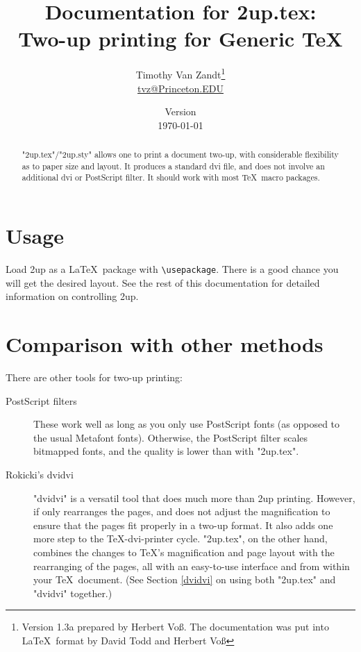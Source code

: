 \documentclass[12pt]{article}
\let\TUfv\fileversion
\begin{document}
\title{Documentation for 2up.tex:\\
  Two-up printing for Generic TeX}
\author{Timothy Van Zandt\thanks{Version 1.3a prepared by Herbert Voß. The documentation was put into
  \LaTeX\ format by David Todd and Herbert Voß}\\ \url{tvz@Princeton.EDU}}
\date{Version \TUfv\\[3pt] \today}

\maketitle
\thispagestyle{empty}

\begin{abstract}
  "2up.tex"/"2up.sty" allows one to print a document two-up, with
considerable flexibility as to paper size and layout. It produces a standard
dvi file, and does not involve an additional dvi or PostScript filter. It
should work with most \TeX\ macro packages.

\end{abstract}

\clearpage
\tableofcontents
\clearpage

\section{Usage} 
Load 2up as a \LaTeX\ package with \texttt{\textbackslash usepackage}.
There is a good chance you will get the desired layout. See the rest of
this documentation for detailed information on controlling 2up.

\section{Comparison with other methods}

There are other tools for two-up printing:
\begin{description}
\item[PostScript filters]
These work well as long as you only use PostScript fonts (as opposed to the
usual Metafont fonts). Otherwise, the PostScript filter scales bitmapped
fonts, and the quality is lower than with "2up.tex".

\item[Rokicki's dvidvi]
"dvidvi" is a versatil tool that does much more than
2up printing. However, if only rearranges the pages, and does not adjust the
magnification to ensure that the pages fit properly in a two-up format. It
also adds one more step to the \TeX-dvi-printer cycle. "2up.tex", on the other
hand, combines the changes to \TeX's magnification and page layout with the
rearranging of the pages, all with an easy-to-use interface and from within
your \TeX\ document. (See Section \ref{dvidvi} on using both "2up.tex" and
"dvidvi" together.)
\end{description}
\end{document}
